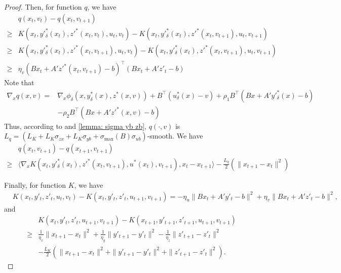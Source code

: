 \documentclass{article}
\theoremstyle{plain}
\theoremstyle{definition}
\theoremstyle{remark}
\begin{document}
\begin{proof}
Then, for function $q$, we have
\begin{align*}
    &q(x_t,v_t)-q(x_t, v_{t+1})\\
    \geq&K(x_t, y'^*_\delta(x_t), z'^*(x_t, v_t), u_t, v_t)-K(x_t, y'^*_\delta(x_t), z'^*(x_t, v_{t+1}), u_t, v_{t+1})\\
    \geq&K(x_t, y'^*_\delta(x_t), z'^*(x_t, v_{t+1}), u_t, v_t)-K(x_t, y'^*_\delta(x_t), z'^*(x_t, v_{t+1}), u_t, v_{t+1})\\
    \geq&\eta_v(Bx_t+A'z'^*(x_t,v_{t+1})-b)^\top(Bx_t+A'z'_t-b)
\end{align*}
Note that
\begin{align*}
    \nabla_x q(x,v)=&\nabla_x \phi_\delta(x, y^*_\delta(x), z^*(x,v))+B^\top(u^*_\delta(x)-v)+\rho_1B^\top(Bx+A'y'^*_\delta(x)-b)\\
    &-\rho_2B^\top(Bx+A'z'^*(x,v)-b)
\end{align*}
Thus, according to  and \ref{lemma: sigma yb zb}, $q(\cdot,v)$ is $L_q=(L_K+L_K\sigma_{zx}+L_K\sigma_{yb}+\sigma_{\max}(B)\sigma_{ub})$-smooth. 
We have
\begin{align*}
    &q(x_t,v_{t+1})-q(x_{t+1}, v_{t+1})\\
    \geq&\langle\nabla_x K(x_t, y'^*_\delta(x_t), z'^*(x_t, v_{t+1}), u^*(x_t), v_{t+1}), x_t-x_{t+1}\rangle-\frac{L_q}{2}(\|x_{t+1}-x_t\|^2)
\end{align*}




Finally, for function $K$, we have
\begin{align*}
    &K(x_t, y'_t, z'_t, u_t, v_t)-K(x_t, y'_t, z'_t, u_{t+1}, v_{t+1})=-\eta_u\|Bx_t+A'y'_t-b\|^2+\eta_v\|Bx_t+A'z'_t-b\|^2,
\end{align*}
and
\begin{align*}
    &K(x_t, y'_t, z'_t, u_{t+1}, v_{t+1})-K(x_{t+1}, y'_{t+1}, z'_{t+1}, u_{t+1}, v_{t+1})\\
    \geq& \frac{1}{\eta_x}\|x_{t+1}-x_t\|^2+\frac{1}{\eta_y}\|y'_{t+1}-y'_t\|^2-\frac{1}{\eta_z}\|z'_{t+1}-z'_t\|^2\\
    &-\frac{L_K}{2}(\|x_{t+1}-x_t\|^2+\|y'_{t+1}-y'_t\|^2+\|z'_{t+1}-z'_t\|^2).
\end{align*}



\end{proof}
\end{document}
